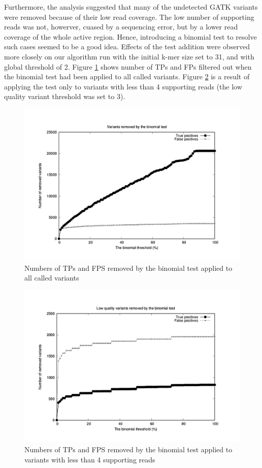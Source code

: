 Furthermore, the analysis suggested that many of the undetected GATK variants were removed because of their low read coverage. The low number of supporting reads was not, howerver, cuased by a sequencing error, but by a lower read coverage of the whole active region. Hence, introducing a binomial test to resolve such cases seemed to be a good idea. Effects of the test addition were observed more closely on our algorithm run with the initial k-mer size set to 31, and with global threshold of 2. Figure \ref{fig:binom-all} shows number of TPs and FPs filtered out when the binomial test had been applied to all called variants. Figure \ref{fig:binom-3} is a result of applying the test only to variants with less than 4 supporting reads (the low quality variant threshold was set to 3).

\begin{figure}
	\centering
	\includegraphics{img/binom-all.pdf}
	\caption{Numbers of TPs and FPS removed by the binomial test applied to all called variants}
	\label{fig:binom-all}
\end{figure}

\begin{figure}
	\centering
	\includegraphics{img/binom-3.pdf}
	\caption{Numbers of TPs and FPS removed by the binomial test applied to variants with less than 4 supporting reads}
	\label{fig:binom-3}
\end{figure}

